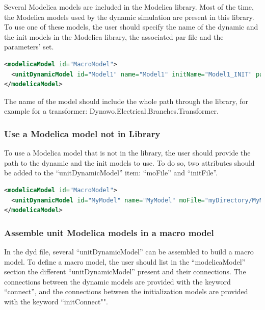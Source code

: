\documentclass[a4paper, 12pt]{report}
\begin{document}
Several Modelica models are included in the \Dynawo Modelica library. Most of the time, the Modelica models used by the dynamic simulation are present in this library. To use one of these models, the user should specify the name of the dynamic and the init models in the Modelica library, the associated par file and the parameters' set.

\begin{lstlisting}[language=XML, morekeywords={name, initName}]
<modelicaModel id="MacroModel">
  <unitDynamicModel id="Model1" name="Model1" initName="Model1_INIT" parFile="MyPar.par" parId="2"/>
</modelicaModel>
\end{lstlisting}

The name of the model should include the whole path through the library, for example for a transformer: Dynawo.Electrical.Branches.Transformer.

\subsubsection[Use a Modelica model not in Dynawo Library]{Use a Modelica model not in \Dynawo Library}

To use a Modelica model that is not in the library, the user should provide the path to the dynamic and the init models to use. To do so, two attributes should be added to the ``unitDynamicModel'' item: ``moFile'' and ``initFile''.

\begin{lstlisting}[language=XML, morekeywords={moFile, initFile}]
<modelicaModel id="MacroModel">
  <unitDynamicModel id="MyModel" name="MyModel" moFile="myDirectory/MyModel.mo" initFile="myDirectory/MyModel_INIT.mo" parFile="MyPar.par" parId="1"/>
</modelicaModel>
\end{lstlisting}

\subsubsection{Assemble unit Modelica models in a macro model}

In the dyd file, several ``unitDynamicModel'' can be assembled to build a macro model. To define a macro model, the user should list in the ``modelicaModel'' section the different ``unitDynamicModel'' present and their connections. The connections between the dynamic models are provided with the keyword ``connect'', and the connections between the initialization models are provided with the keyword ``initConnect"".
\end{document}
